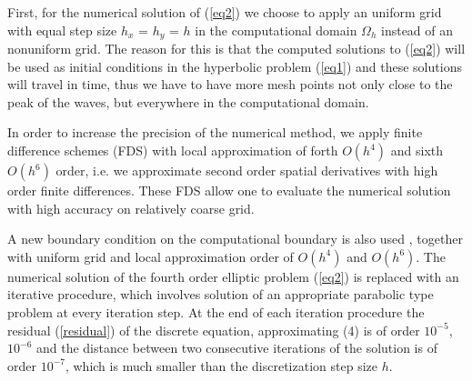 \documentclass[preprint]{elsarticle}
\newcommand{\rf}[1]{(\ref{#1})}
\begin{document}
First, for the numerical solution of \rf{eq2} we choose to apply an uniform grid with equal step size $h_x$ = $h_y$ = $h$ in the computational domain $\Omega_h$ instead of an nonuniform grid. The reason for this is that  
%
 the computed solutions to \rf{eq2} will be used as initial conditions in the hyperbolic problem \rf{eq1} and these solutions will travel in time, thus we have to have more mesh points not only close to the peak of the waves, but everywhere in   the  computational domain. 

In order to increase the precision of the numerical method, we apply finite difference schemes (FDS) with local approximation of forth $O(h^4)$ and sixth $O(h^6)$ order, i.e. we  approximate second order spatial derivatives with high order finite differences. These  FDS allow one to evaluate the numerical solution with high accuracy on relatively coarse grid. 

A new boundary condition on the computational boundary is also used \cite{bnd}, together with uniform grid and local approximation order of $O(h^4)$ and $O(h^6)$. The numerical solution of the fourth order elliptic problem \rf{eq2} is replaced with an iterative procedure, which involves solution  of an appropriate  parabolic type problem at every iteration step. %
At the end of each iteration procedure the residual \rf{residual}  of the discrete equation, approximating (4) is of order $10^{-5}$, $10^{-6}$ and the distance between two consecutive iterations of the solution is of order $10^{-7}$, which is much smaller than the discretization step size $h$.
 
\end{document}
